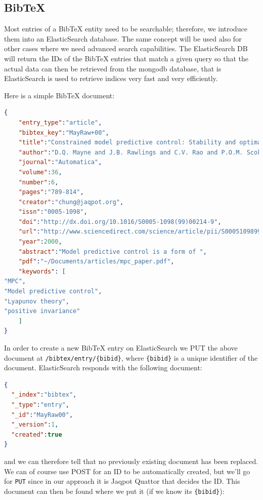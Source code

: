 \subsection{BibTeX}
Most entries of a BibTeX entity need to be searchable; 
therefore, we introduce them into an ElasticSearch database. 
The same concept will be used also for other cases where we need advanced 
search capabilities. The ElasticSearch DB will return the IDs of the 
BibTeX entries that match a given query so that the actual data can then 
be retrieved from the mongodb database, that is ElasticSearch is used to 
retrieve indices very fast and very efficiently. 

Here is a simple BibTeX document:

\begin{lstlisting}[language=json]
{
    "entry_type":"article",
    "bibtex_key":"MayRaw+00",
    "title":"Constrained model predictive control: Stability and optimality",
    "author":"D.Q. Mayne and J.B. Rawlings and C.V. Rao and P.O.M. Scokaert",
    "journal":"Automatica",
    "volume":36,
    "number":6,
    "pages":"789-814",
    "creator":"chung@jaqpot.org",
    "issn":"0005-1098",
    "doi":"http://dx.doi.org/10.1016/S0005-1098(99)00214-9",   
    "url":"http://www.sciencedirect.com/science/article/pii/S0005109899002149",
    "year":2000,
    "abstract":"Model predictive control is a form of ",
    "pdf":"~/Documents/articles/mpc_paper.pdf",
    "keywords": [
"MPC", 
"Model predictive control",
"Lyapunov theory",
"positive invariance"
    ]
}
\end{lstlisting}
In order to create a new BibTeX entry on ElasticSearch we PUT the above document 
at \texttt{/bibtex/entry/\{bibid\}}, where \texttt{\{bibid\}} is a unique 
identifier of the document. ElasticSearch responds with the following document:
\begin{lstlisting}[language=json]
{
  "_index":"bibtex",
  "_type":"entry",
  "_id":"MayRaw00",
  "_version":1,
  "created":true
}
\end{lstlisting}
%
%
and we can therefore tell that no previously existing document has been replaced. 
We can of course use POST for an ID to be automatically created, but we'll go for 
\texttt{PUT} since in our approach it is Jaqpot Quattor that decides the ID. 
This document can then be found where we put it (if we know its \texttt{\{bibid\}}):

